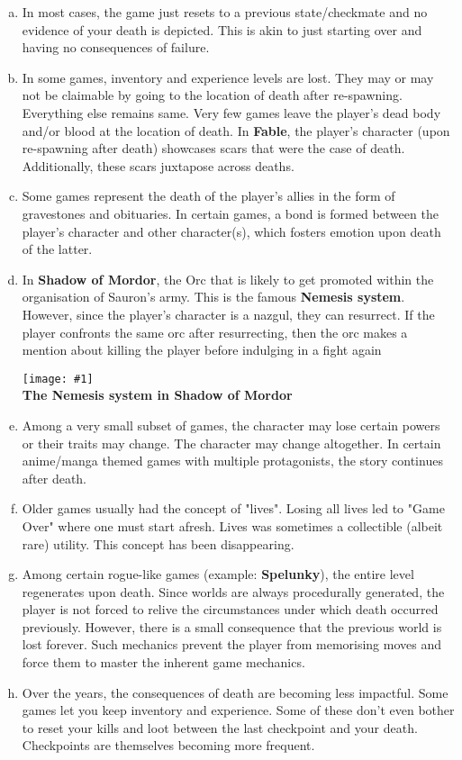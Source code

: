 \documentclass[12pt]{article}
\newcommand{\fig}[3]{\begin{center} \texttt{[image: \#1]}\\ \textbf{#3} \end{center}}
\begin{document}
\begin{enumerate}[a)]

\item In most cases, the game just resets to a previous state/checkmate and no evidence of your death is depicted. This is akin to just starting over and having no consequences of failure.

\item In some games, inventory and experience levels are lost. They may or may not be claimable by going to the location of death after re-spawning. Everything else remains same. Very few games leave the player's dead body and/or blood at the location of death. In \textbf{Fable}, the player's character (upon re-spawning after death) showcases scars that were the case of death. Additionally, these scars juxtapose across deaths.

\item Some games represent the death of the player's allies in the form of gravestones and obituaries. In certain games, a bond is formed between the player's character and other character(s), which fosters emotion upon death of the latter.

\item In \textbf{Shadow of Mordor}, the Orc that is likely to get promoted within the organisation of Sauron's army. This is the famous \textbf{Nemesis system}. However, since the player's character is a nazgul, they can resurrect. If the player confronts the same orc after resurrecting, then the orc makes a mention about killing the player before indulging in a fight again

\fig{shadow_of_mordor_nemesis.jpg}{0.3}{The Nemesis system in Shadow of Mordor}

\item Among a very small subset of games, the character may lose certain powers or their traits may change. The character may change altogether. In certain anime/manga themed games with multiple protagonists, the story continues after death.

\item Older games usually had the concept of "lives". Losing all lives led to "Game Over" where one must start afresh. Lives was sometimes a collectible (albeit rare) utility. This concept has been disappearing.

\item Among certain rogue-like games (example: \textbf{Spelunky}), the entire level regenerates upon death. Since worlds are always procedurally generated, the player is not forced to relive the circumstances under which death occurred previously. However, there is a small consequence that the previous world is lost forever. Such mechanics prevent the player from memorising moves and force them to master the inherent game mechanics.

\item Over the years, the consequences of death are becoming less impactful. Some games let you keep inventory and experience. Some of these don't even bother to reset your kills and loot between the last checkpoint and your death. Checkpoints are themselves becoming more frequent.

\end{enumerate}
\end{document}
